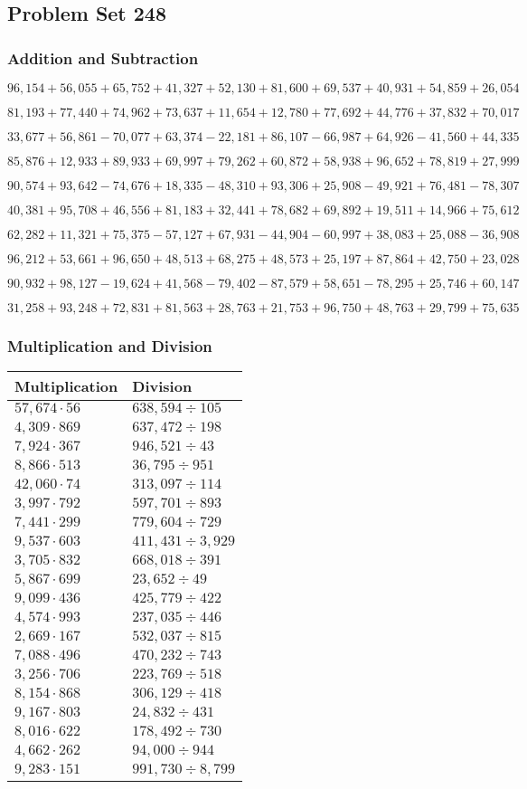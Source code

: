 \hypertarget{problem-set-248}{%
\subsection{Problem Set 248}\label{problem-set-248}}

\hypertarget{addition-and-subtraction}{%
\subsubsection{Addition and
Subtraction}\label{addition-and-subtraction}}

\(96,154+56,055+65,752+41,327+52,130+81,600+69,537+40,931+54,859+26,054\)

\(81,193+77,440+74,962+73,637+11,654+12,780+77,692+44,776+37,832+70,017\)

\(33,677+56,861-70,077+63,374-22,181+86,107-66,987+64,926-41,560+44,335\)

\(85,876+12,933+89,933+69,997+79,262+60,872+58,938+96,652+78,819+27,999\)

\(90,574+93,642-74,676+18,335-48,310+93,306+25,908-49,921+76,481-78,307\)

\(40,381+95,708+46,556+81,183+32,441+78,682+69,892+19,511+14,966+75,612\)

\(62,282+11,321+75,375-57,127+67,931-44,904-60,997+38,083+25,088-36,908\)

\(96,212+53,661+96,650+48,513+68,275+48,573+25,197+87,864+42,750+23,028\)

\(90,932+98,127-19,624+41,568-79,402-87,579+58,651-78,295+25,746+60,147\)

\(31,258+93,248+72,831+81,563+28,763+21,753+96,750+48,763+29,799+75,635\)

\hypertarget{multiplication-and-division}{%
\subsubsection{Multiplication and
Division}\label{multiplication-and-division}}

\begin{longtable}[]{@{}ll@{}}
\toprule
Multiplication & Division\tabularnewline
\midrule
\endhead
\(57,674\cdot56\) & \(638,594÷105\)\tabularnewline
\(4,309\cdot869\) & \(637,472÷198\)\tabularnewline
\(7,924\cdot367\) & \(946,521÷43\)\tabularnewline
\(8,866\cdot513\) & \(36,795÷951\)\tabularnewline
\(42,060\cdot74\) & \(313,097÷114\)\tabularnewline
\(3,997\cdot792\) & \(597,701÷893\)\tabularnewline
\(7,441\cdot299\) & \(779,604÷729\)\tabularnewline
\(9,537\cdot603\) & \(411,431÷3,929\)\tabularnewline
\(3,705\cdot832\) & \(668,018÷391\)\tabularnewline
\(5,867\cdot699\) & \(23,652÷49\)\tabularnewline
\(9,099\cdot436\) & \(425,779÷422\)\tabularnewline
\(4,574\cdot993\) & \(237,035÷446\)\tabularnewline
\(2,669\cdot167\) & \(532,037÷815\)\tabularnewline
\(7,088\cdot496\) & \(470,232÷743\)\tabularnewline
\(3,256\cdot706\) & \(223,769÷518\)\tabularnewline
\(8,154\cdot868\) & \(306,129÷418\)\tabularnewline
\(9,167\cdot803\) & \(24,832÷431\)\tabularnewline
\(8,016\cdot622\) & \(178,492÷730\)\tabularnewline
\(4,662\cdot262\) & \(94,000÷944\)\tabularnewline
\(9,283\cdot151\) & \(991,730÷8,799\)\tabularnewline
\bottomrule
\end{longtable}
